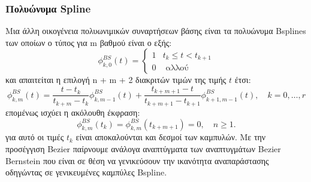 \begin{appendices}
    \subsubsection{Πολυώνυμα Spline}
    Μια άλλη οικογένεια πολυωνιμικών συναρτήσεων βάσης είναι τα πολυώνυμα Bsplines των οποίων ο τύπος για m βαθμού είναι ο εξής:
    \[
        \phi_{k, 0}^{B S}(t)= \begin{cases}1 & t_k \leq t<t_{k+1} \\ 0 & \text { αλλού }\end{cases}
    \]
    και απαιτείται η επιλογή n + m + 2 διακριτών τιμών της τιμής $t$ έτσι:
    \[
        \phi_{k, m}^{B S}(t)=\frac{t-t_k}{t_{k+m}-t_k} \phi_{k, m-1}^{B S}(t)+\frac{t_{k+m+1}-t}{t_{k+m+1}-t_{k+1}} \phi_{k+1, m-1}^{B S}(t), \quad k=0, \ldots, r
    \]
    επομένως ισχύει η ακόλουθη έκφραση:
    \[
        \phi_{k, m}^{B S}\left(t_k\right)=\phi_{k, m}^{B S}\left(t_{k+m+1}\right)=0, \quad n \geq 1 .
    \]
    για αυτό οι τιμές $t_k$ είναι αποκαλούνται και δεσμοί των καμπυλών.
    Με την προσέγγιση Bezier παίρνουμε ανάλογα αναπτύγματα των αναπτυγμάτων Bezier Bernstein που είναι σε θέση να γενικεύσουν την ικανότητα αναπαράστασης οδηγώντας σε γενικευμένες καμπύλες Bspline.

\end{appendices}
